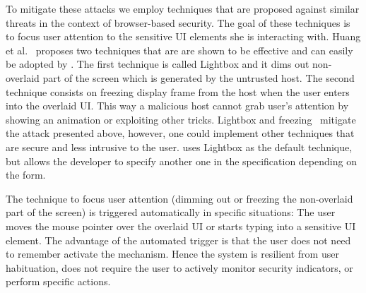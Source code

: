 To mitigate these attacks we employ techniques that are proposed against similar threats in the context of browser-based security. The goal of these techniques is to focus user attention to the sensitive UI elements she is interacting with. Huang et al.~\cite{huang2012clickjacking} proposes two techniques that are are shown to be effective and can easily be adopted by \device.
The first technique is called Lightbox and it dims out non-overlaid part of the screen which is generated by the untrusted host. The second technique consists on freezing display frame from the host when the user enters into the overlaid UI. This way a malicious host cannot grab user's attention by showing an animation or exploiting other tricks.
Lightbox and freezing~\cite{huang2012clickjacking} mitigate the attack presented above, however, one could implement other techniques that are secure and less intrusive to the user. 
\device uses Lightbox as the default technique, but allows the developer to specify another one in the specification depending on the form.



 The technique to focus user attention (dimming out or freezing the non-overlaid part of the screen) is triggered automatically in specific situations: The user moves the mouse pointer over the overlaid UI or starts typing into a sensitive UI element. 
The advantage of the automated trigger is that the user does not need to remember activate the mechanism. Hence the system is resilient from user habituation, does not require the user to actively monitor security indicators, or perform specific actions.


